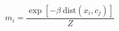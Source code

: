 \documentclass[10pt,a4paper]{article}
\author{J. T. Monroe}
\begin{document}
	\[
	m_i = \frac{\exp\left[-\beta ~\mathrm{dist}(x_i, c_j)\right]}{Z}
	\]
\end{document}
